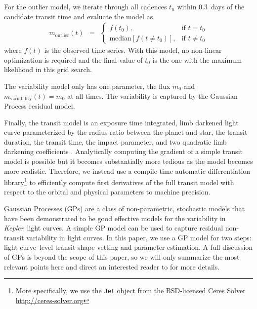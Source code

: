 \documentclass[manuscript, letterpaper]{aastex6}
\makeatletter
\let\origsection\section
\renewcommand\section{\@ifstar{\starsection}{\nostarsection}}
\newcommand\nostarsection[1]{\sectionprelude\origsection{#1}}
\newcommand\starsection[1]{\sectionprelude\origsection*{#1}}
\newcommand\sectionprelude{\vspace{1em}}
\newcommand{\project}[1]{\textsl{#1}}
\newcommand{\kepler}{\project{Kepler}}
\newcommand{\sectlabel}[1]{\label{sect:#1}}
\newcommand{\paper}{paper}
\newcommand{\modelname}[1]{{\textsf{#1}}}
\makeatother
\begin{document}
\begin{itemize}
{\item
For the \modelname{outlier} model, we iterate through all cadences $t_n$
within 0.3~days of the candidate transit time and evaluate the model as
\begin{eqnarray}
m_\mathrm{outlier}(t) &=& \left\{\begin{array}{ll}
f(t_0), & \mbox{if $t = t_0$} \\
\mathrm{median}[f(t \ne t_0)], & \mbox{if $t \ne t_0$}
\end{array}\right.
\end{eqnarray}
where $f(t)$ is the observed time series.
With this model, no non-linear optimization is required and the final value of
$t_0$ is the one with the maximum likelihood in this grid search.
}

{\item
The \modelname{variability} model only has one parameter, the flux $m_0$ and
$m_\mathrm{variability}(t) = m_0$ at all times.
The variability is captured by the Gaussian Process residual model.
}

{\item
Finally, the \modelname{transit} model is an exposure time integrated,
limb darkened light curve \citep{Mandel:2002, Kipping:2010} parameterized by
the radius ratio between the planet and star, the transit duration, the
transit time, the impact parameter, and two quadratic limb darkening
coefficients \citep{Kipping:2013}.
Analytically computing the gradient of a simple transit model is possible
\citep{Pal:2008} but it becomes substantially more tedious as the model
becomes more realistic.
Therefore, we instead use a compile-time automatic differentiation
library\footnote{More specifically, we use the \texttt{Jet} object from the
BSD-licensed Ceres Solver \url{http://ceres-solver.org}} \citep{Agarwal:2016}
to efficiently compute first derivatives of the full transit model with
respect to the orbital and physical parameters to machine precision.
}

\end{itemize}



\section{Gaussian process regression}\sectlabel{gp-regression}

Gaussian Processes (GPs) are a class of non-parametric, stochastic models that
have been demonstrated to be good effective models for the variability in
\kepler\ light curves.
A simple GP model can be used to capture residual non-transit variability in
light curves.
In this \paper, we use a GP model for two steps: light curve--level transit
shape vetting and parameter estimation.
A full discussion of GPs is beyond the scope of this \paper, so we will only
summarize the most relevant points here and direct an interested reader to
\citet{Rasmussen:2006} for more details.
\end{document}
